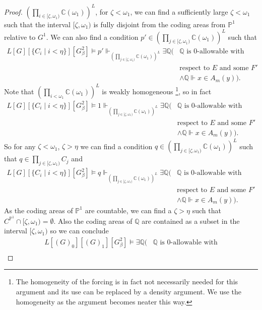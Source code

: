 \documentclass[a4paper,11pt]{article}
\newcommand{\forceP}{\mathbb{P}}
\newcommand{\forceQ}{\mathbb{Q}}
\begin{document}
\begin{proof}
$(\prod_{ i \in [\zeta,\omega_1)} \mathbb{C} (\omega_1))^L$, for $\zeta < \omega_1$, we can find a sufficiently large $\zeta< \omega _1$ such that the interval $[\zeta, \omega_1)$ is fully disjoint from the coding areas from $\forceP^1$ relative to $G^1$. We can also find a condition $p' \in (\prod_{j \in [\zeta,\omega_1)} \mathbb{C} (\omega_1))^L$ such that 
\begin{align*}
L[G] [\{C_i \mid i < \eta \}] [G^2_{\beta}] \models p'  \Vdash_{(\prod_{j \in [\zeta,\omega_1)} \mathbb{C} (\omega_1))^L}  \exists \forceQ (&\forceQ \text{ is } 0 \text{-allowable with} \\&
\text{respect to } E \text{ and some $F'$ }  \\& \land \forceQ \Vdash {x} \in A_m({y})).
\end{align*}
Note that $(\prod_{i< \omega_1} \mathbb{C} (\omega_1))^L$ is weakly homogeneous \footnote{The homogeneity of the forcing is in fact not necessarily needed for this argument and its use can be replaced by a density argument. We use the homogeneity as the argument becomes neater this way.}, so in fact
\begin{align*}
L[G] [\{C_i \mid i < \eta \}] [G^2_{\beta}] \models 1  \Vdash_{(\prod_{j \in [\zeta,\omega_1)} \mathbb{C} (\omega_1))^L}  \exists \forceQ (&\forceQ \text{ is } 0 \text{-allowable with} \\&
\text{respect to } E \text{ and some $F'$}  \\& \land \forceQ \Vdash {x} \in A_m({y})).
\end{align*}
So for any $\zeta < \omega_1$, $\zeta > \eta$ we can find a condition $q \in (\prod_{j \in [\zeta,\omega_1) } \mathbb{C} (\omega_1))^L$ such that $q \in \prod_{j \in [\zeta,\omega_1) } C_j$ and
\begin{align*}
L[G] [\{C_i \mid i < \eta \}] [G^2_{\beta}] \models q  \Vdash_{(\prod_{j \in [\zeta,\omega_1)} \mathbb{C} (\omega_1))^L}  \exists \forceQ (&\forceQ \text{ is } 0 \text{-allowable with} \\&
\text{respect to } E \text{ and some $F'$ }  \\& \land \forceQ \Vdash {x} \in A_m({y})).
\end{align*}
As the coding areas of $\forceP^1$ are countable, we can find a $\zeta> \eta$ such that $C^{\forceP^1} \cap [\zeta, \omega_1) = \emptyset$. Also the coding areas of $\forceQ$ are contained as a subset in the interval $[\zeta,\omega_1)$ so we can conclude
\begin{align*}
L[(G)_0] [(G)_1] [G^2_{\beta}] \models  \exists \forceQ (&\forceQ \text{ is } 0 \text{-allowable with} \\&

\end{align*}
\end{proof}
\end{document}
